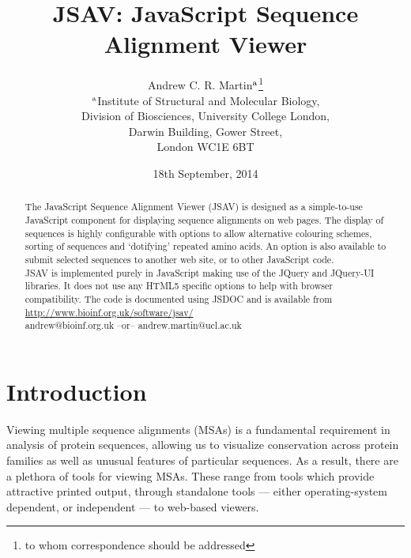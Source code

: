 \documentclass[a4]{article}
\title{JSAV: JavaScript Sequence Alignment Viewer}
\date{18th September, 2014}
\author{Andrew C. R. Martin\mbox{${}^{\rm a}$}\footnote{to whom
    correspondence should be addressed}\\
    \mbox{${}^{\rm a}$}Institute of Structural and Molecular Biology,\\
Division of Biosciences, University College London,\\
Darwin Building, Gower Street,\\
London WC1E 6BT}
\begin{document}
\maketitle

\begin{abstract}
 The JavaScript Sequence Alignment Viewer
(JSAV) is designed as a simple-to-use JavaScript component for
displaying sequence alignments on web pages.  The display of sequences
is highly configurable with options to allow alternative colouring
schemes, sorting of sequences and `dotifying' repeated amino acids. An
option is also available to submit selected sequences to another web
site, or to other JavaScript code.  \\
JSAV is implemented purely in JavaScript making use of the JQuery and
JQuery-UI libraries. It does not use any HTML5 specific options to help with
browser compatibility. The code is documented using JSDOC
and is available from \url{http://www.bioinf.org.uk/software/jsav/}\\
 andrew@bioinf.org.uk --or--
andrew.martin@ucl.ac.uk
\end{abstract}


\section{Introduction}
Viewing multiple sequence alignments (MSAs) is a fundamental
requirement in analysis of protein sequences, allowing us to visualize
conservation across protein families as well as unusual features of
particular sequences. As a result, there are a plethora of tools for
viewing MSAs. These range from tools which provide attractive printed
output, through standalone tools --- either operating-system
dependent, or independent --- to web-based viewers.
\end{document}
